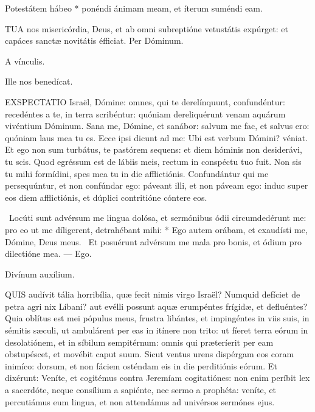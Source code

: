 
 Potestátem hábeo * ponéndi ánimam meam, et íterum suméndi eam.


\lettrine[lines=2]{T}{UA} nos misericórdia, Deus, et ab omni subreptióne vetustátis expúrget: et capáces sanctæ novitátis éfficiat. Per Dóminum.

\sectionornament



 A vínculis.

 Ille nos benedícat.



\lettrine[lines=2]{E}{XSPECTATIO} Israël, Dómine: omnes, qui te derelínquunt, confundéntur: recedéntes a te, in terra scribéntur: quóniam dereliquérunt venam aquárum vivéntium Dóminum. Sana me, Dómine, et sanábor: salvum me fac, et salvus ero: quóniam laus mea tu es. Ecce ipsi dicunt ad me: Ubi est verbum Dómini? véniat. Et ego non sum turbátus, te pastórem sequens: et diem hóminis non desiderávi, tu scis. Quod egréssum est de lábiis meis, rectum in conspéctu tuo fuit. Non sis tu mihi formídini, spes mea tu in die afflictiónis. Confundántur qui me persequúntur, et non confúndar ego: páveant illi, et non páveam ego: induc super eos diem afflictiónis, et dúplici contritióne cóntere eos.

\R\ Locúti sunt advérsum me lingua dolósa, et sermónibus ódii circumdedérunt me: pro eo ut me díligerent, detrahébant mihi: * Ego autem orábam, et exaudísti me, Dómine, Deus meus. \V\ Et posuérunt advérsum me mala pro bonis, et ódium pro dilectióne mea. --- Ego.

 Divínum auxílium.


\lettrine[lines=2]{Q}{UIS} audívit tália horribília, quæ fecit nimis virgo Israël? Numquid defíciet de petra agri nix Líbani? aut evélli possunt aquæ erumpéntes frígidæ, et defluéntes? Quia oblítus est mei pópulus meus, frustra libántes, et impingéntes in viis suis, in sémitis sæculi, ut ambulárent per eas in itínere non trito: ut fíeret terra eórum in desolatiónem, et in síbilum sempitérnum: omnis qui præteríerit per eam obstupéscet, et movébit caput suum. Sicut ventus urens dispérgam eos coram inimíco: dorsum, et non fáciem osténdam eis in die perditiónis eórum. Et dixérunt: Veníte, et cogitémus contra Jeremíam cogitatiónes: non enim períbit lex a sacerdóte, neque consílium a sapiénte, nec sermo a prophéta: veníte, et percutiámus eum lingua, et non attendámus ad univérsos sermónes ejus.

